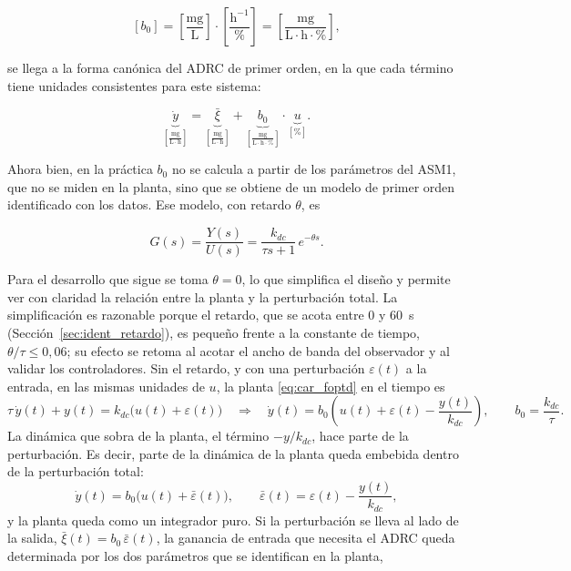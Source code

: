 \begin{equation}
\left[b_0\right]=\left[\frac{\mathrm{mg}}{\mathrm{L}}\right] \cdot \left[\frac{\mathrm{h}^{-1}}{\%}\right]
= \left[\frac{\mathrm{mg}}{\mathrm{L}\cdot\mathrm{h}\cdot\%}\right],
\end{equation}

se llega a la forma canónica del ADRC de primer orden, en la que cada término
tiene unidades consistentes para este sistema:

\begin{equation}
\underbrace{\dot{y}}_{\left[\frac{\mathrm{mg}}{\mathrm{L}\cdot\mathrm{h}}\right]}
=
\underbrace{\bar{\xi}}_{\left[\frac{\mathrm{mg}}{\mathrm{L}\cdot\mathrm{h}}\right]}
+
\underbrace{b_0}_{\left[\frac{\mathrm{mg}}{\mathrm{L}\cdot\mathrm{h}\cdot\%}\right]}
\cdot
\underbrace{u}_{[\%]} .
\label{eq:car_canonica}
\end{equation}

Ahora bien, en la práctica $b_0$ no se calcula a partir de los parámetros del
ASM1, que no se miden en la planta, sino que se obtiene de un modelo de primer
orden identificado con los datos. Ese modelo, con retardo $\theta$, es

\begin{equation}
G(s)=\frac{Y(s)}{U(s)}
=
\frac{k_{dc}}{\tau s+1}\,e^{-\theta s}.
\label{eq:car_foptd}
\end{equation}

Para el desarrollo que sigue se toma $\theta=0$, lo que simplifica el diseño
y permite ver con claridad la relación entre la planta y la perturbación total.
La simplificación es razonable porque el retardo, que se acota entre 0 y
60~s (Sección~\ref{sec:ident_retardo}), es pequeño frente a la constante de
tiempo, $\theta/\tau \leq 0{,}06$; su efecto se retoma al acotar el ancho
de banda del observador y al validar los controladores. Sin el retardo, y con una perturbación $\varepsilon(t)$ a la entrada, en las
mismas unidades de $u$, la planta \eqref{eq:car_foptd} en el tiempo es
\begin{equation}
\tau\,\dot{y}(t) + y(t) = k_{dc}\bigl(u(t) + \varepsilon(t)\bigr)
\quad\Longrightarrow\quad
\dot{y}(t) = b_0\left(u(t) + \varepsilon(t) - \frac{y(t)}{k_{dc}}\right),
\qquad b_0 = \frac{k_{dc}}{\tau} .
\end{equation}
La dinámica que sobra de la planta, el término $-y/k_{dc}$, hace parte de la perturbación. Es decir, parte de la dinámica de la planta queda embebida dentro de la
perturbación total:
\begin{equation}
\dot{y}(t) = b_0\bigl(u(t) + \bar{\varepsilon}(t)\bigr),
\qquad
\bar{\varepsilon}(t) = \varepsilon(t) - \frac{y(t)}{k_{dc}},
\label{eq:planta_eps_bar}
\end{equation}
y la planta queda como un integrador puro. Si la perturbación se lleva al lado de la salida,
$\bar{\xi}(t) = b_0\,\bar{\varepsilon}(t)$, la ganancia de entrada que necesita el ADRC queda determinada
por los dos parámetros que se identifican en la planta,

